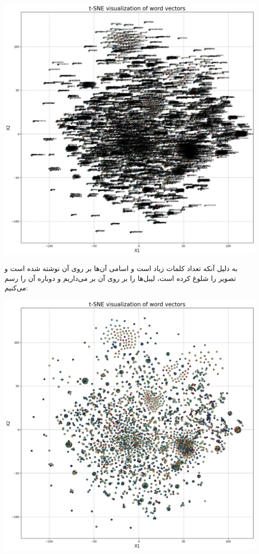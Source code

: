 \begin{enumerate}
\begin{qsolve}
	\begin{center}
		\includegraphics*[width=0.8\linewidth]{pics/img15.png}
		\label{نمایش بردارهای کلمات}
	\end{center}
		
		
	\end{qsolve}
	
	
	
	
	
	 \begin{qsolve}
	 	به دلیل آنکه تعداد کلمات زیاد است و اسامی آن‌ها بر روی آن نوشته شده است و تصویر را شلوغ کرده است، لیبل‌ها را بر روی آن بر می‌داریم و دوباره آن را رسم می‌کنیم:
	 	
	 	\begin{center}
	 		\includegraphics*[width=0.8\linewidth]{pics/img16.png}
	 		\label{نمایش برداری کلمات بدون اسامی}
	 	\end{center}
	 	

\end{qsolve}
\end{enumerate}
